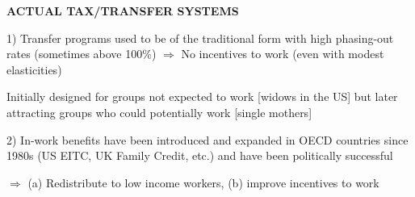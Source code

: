 \documentclass[landscape]{slides}
\begin{document}
%
%
%
%
%
%

\begin{slide}
\begin{center}
{\bf ACTUAL TAX/TRANSFER SYSTEMS}
\end{center}

1) Transfer programs used to be of the traditional form with high
phasing-out rates (sometimes above 100\%) $\Rightarrow$ No
incentives to work (even with modest elasticities)

Initially designed for
groups not expected to work [widows in the US] but later attracting
groups who could potentially work [single mothers]

2) In-work benefits have been introduced and expanded in OECD
countries since 1980s (US EITC, UK Family Credit, etc.) and have
been politically successful 

$\Rightarrow$ (a) Redistribute to low
income workers, (b) improve incentives to work

\end{slide}


%
%
%
%
\end{document}
